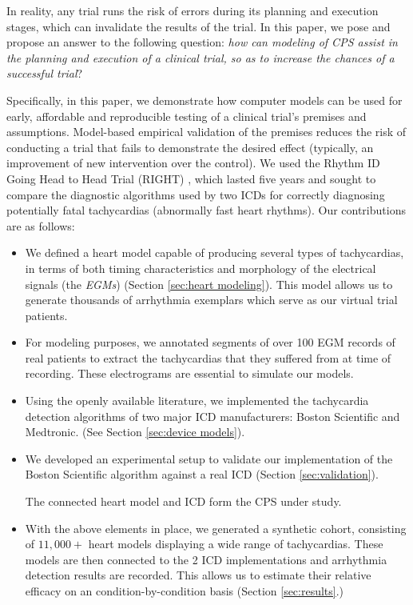 In reality, any trial runs the risk of errors during its planning and execution stages, which can invalidate the results of the trial.
In this paper, we pose and propose an answer to the following question: \emph{how can modeling of CPS assist in the planning and execution of a clinical trial, so as to increase the chances of a successful trial}?

Specifically, in this paper,
we demonstrate how  computer models can be used for early, affordable and reproducible testing of a clinical trial's premises and assumptions.
Model-based empirical validation of the premises reduces the risk of conducting a trial that fails to demonstrate the desired effect (typically, an improvement of new intervention over the control). 
We used the Rhythm ID Going Head to Head Trial (RIGHT) \cite{GoldABBTB11_RIGHTresults}, which lasted five years and sought to compare the diagnostic algorithms used by two ICDs for correctly diagnosing potentially fatal tachycardias (abnormally fast heart rhythms).
Our contributions are as follows:
\begin{itemize}
	\item We defined a heart model capable of producing several types of tachycardias, in terms of both timing characteristics and morphology of the electrical signals (the \emph{\acp{EGM}})
	(Section \ref{sec:heart modeling}).
	This model allows us to generate thousands of arrhythmia exemplars which serve as our virtual trial patients.
	\item For modeling purposes, we annotated segments of over 100 \ac{EGM} records of real patients to extract the tachycardias that they suffered from at time of recording.
	These electrograms are essential to simulate our models.
	\item Using the openly available literature, we implemented the tachycardia detection algorithms of two major ICD manufacturers: Boston Scientific and Medtronic.
	(See Section \ref{sec:device models}).
	\item We developed an experimental setup to validate our implementation of the Boston Scientific algorithm against a real ICD (Section \ref{sec:validation}).
	
	The connected heart model and ICD form the CPS under study.
	\item With the above elements in place, we generated a synthetic cohort, consisting of $11,000+$ heart models displaying a wide range of tachycardias.
	These models are then connected to the 2 ICD implementations and arrhythmia detection results are recorded.
	This allows us to estimate their relative efficacy on an condition-by-condition basis
	(Section \ref{sec:results}.)
\end{itemize}


